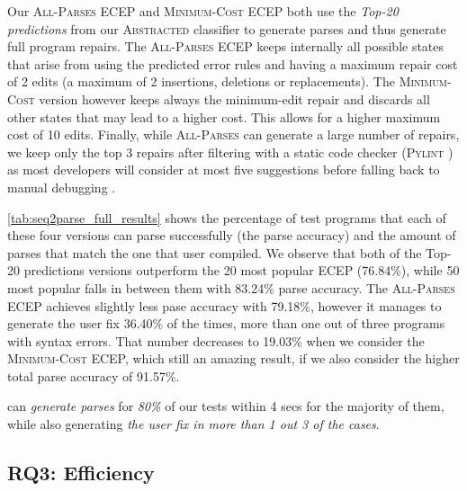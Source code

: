 Our \textsc{All-Parses} ECEP and \textsc{Minimum-Cost} ECEP both use the
\emph{Top-20 predictions} from our \textsc{Abstracted} classifier to generate
parses and thus generate full program repairs. The \textsc{All-Parses} ECEP
keeps internally all possible states that arise from using the predicted error
rules and having a maximum repair cost of 2 edits (\ie a maximum of 2
insertions, deletions or replacements). The \textsc{Minimum-Cost} version
however keeps always the minimum-edit repair and discards all other states that
may lead to a higher cost. This allows for a higher maximum cost of 10 edits.
Finally, while \textsc{All-Parses} can generate a large number of repairs, we
keep only the top 3 repairs after filtering with a static code checker
(\textsc{Pylint} \citep{pylint2022}) as most developers will consider at most five
suggestions before falling back to manual debugging \citep{Kochhar2016-oc,
Parnin2011-ce}.

\autoref{tab:seq2parse_full_results} shows the percentage of test programs that
each of these four versions can parse successfully (\ie the parse accuracy) and
the amount of parses that match the one that user compiled. We observe that both
of the Top-20 predictions versions outperform the 20 most popular ECEP
(76.84\%), while 50 most popular falls in between them with 83.24\% parse
accuracy. The \textsc{All-Parses} ECEP achieves slightly less pase accuracy with
79.18\%, however it manages to generate the user fix 36.40\% of the times, \ie
more than one out of three programs with syntax errors. That number decreases to
19.03\% when we consider the \textsc{Minimum-Cost} ECEP, which still an amazing
result, if we also consider the higher total parse accuracy of 91.57\%.

\begin{framed}
  \noindent \toolname can \emph{generate parses} for \emph{80\%} of our tests
  within 4 secs for the majority of them, while also generating \emph{the user
  fix in more than 1 out 3 of the cases}.
\end{framed}

\subsection{RQ3: Efficiency}
\label{sec:eval:efficiency}





